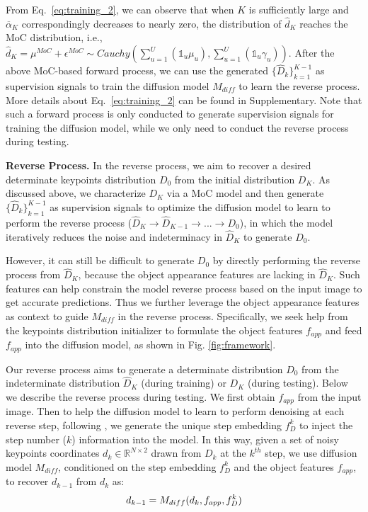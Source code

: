 \documentclass[10pt,twocolumn,letterpaper]{article}
\begin{document}
From Eq.~\ref{eq:training_2}, we can observe that when $K$ is sufficiently large and $\overline{\alpha}_K$ correspondingly decreases to nearly zero, the distribution of $\hat{d}_K$ reaches the MoC distribution, i.e., $\hat{d}_K = \mu^{MoC} + \epsilon^{MoC} \sim Cauchy(\sum^U_{u=1} (\mathds{1}_u \mu_u), \sum^U_{u=1} (\mathds{1}_u \gamma_u))$. 
After the above MoC-based forward process, we can use the generated 
$\{\hat{D}_k\}^{K-1}_{k=1}$ as supervision signals
to train the diffusion model $M_{diff}$ to learn the reverse process.
More details about Eq.~\ref{eq:training_2} can be found in Supplementary.
Note that such a forward process is only conducted to generate supervision signals for training the diffusion model, while we only need to conduct the reverse process during testing.


\noindent\textbf{Reverse Process.} 
In the reverse process, we aim to recover a desired determinate keypoints distribution $D_0$ from the initial distribution $D_K$.
As discussed above, we characterize $D_K$ via a MoC model and then generate 
$\{\hat{D}_k\}^{K-1}_{k=1}$ 
as supervision signals to optimize the diffusion model to learn to perform the reverse process ($\hat{D}_K \to \hat{D}_{K-1} \to ... \to D_0$), in which the model iteratively reduces the noise and indeterminacy in $\hat{D}_K$ to generate $D_0$.

However, it can still be difficult to generate $D_0$ by directly performing the reverse process from $\hat{D}_K$,
because the object appearance features are lacking in $\hat{D}_K$.
Such features can help constrain the model reverse process based on the input image to get accurate predictions. 
Thus we further leverage the object appearance features as context to guide $M_{diff}$ in the reverse process.
Specifically, we seek help from the keypoints distribution initializer to formulate the object features $f_{app}$ and feed $f_{app}$  
into the diffusion model, as shown in Fig. \ref{fig:framework}. 


Our reverse process aims to generate a determinate distribution $D_0$ from the indeterminate distribution $\hat{D}_K$ (during training) or $D_K$ (during testing). 
Below we describe the reverse process during testing.
We first obtain $f_{app}$ from the input image.
Then to help the diffusion model to learn to perform denoising at each reverse step, following \cite{NEURIPS2020_DDPM, song2021denoising}, we generate the unique step embedding $f^k_{D}$ to inject the step number ($k$) information into the model.
In this way, given a set of noisy keypoints coordinates $d_k \in \mathbb{R}^{N\times2}$ drawn from ${D}_k$ at the $k^{th}$ step, we use diffusion model $M_{diff}$, conditioned on the step embedding $f^k_D$ and the object features $f_{app}$, to recover ${d}_{k-1}$ from ${d}_{k}$ as:
\begin{equation} \label{eq:denoising}
\setlength{\abovedisplayskip}{3pt}
\setlength{\belowdisplayskip}{3pt}
{d}_{k-1} = M_{diff}({d}_k, f_{app}, f^k_D)
\end{equation}
\end{document}
